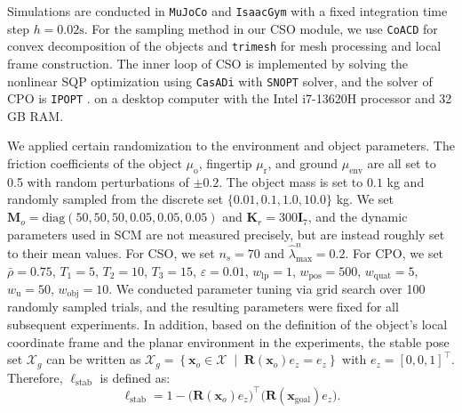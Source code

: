 Simulations are conducted in \texttt{MuJoCo} \cite{todorov2012mujoco} and  \texttt{IsaacGym} \cite{makoviychuk2021isaac} with a fixed integration time step $h=0.02 \text{s}$. For the sampling method in our CSO module, we use \texttt{CoACD} \cite{wei2022approximate} for convex decomposition of the objects and \texttt{trimesh} for mesh processing and local frame construction. The inner loop of CSO is implemented by solving the nonlinear SQP optimization using \texttt{CasADi} \cite{Andersson2019} with \texttt{SNOPT} \cite{gill2005snopt} solver, and the solver of CPO is \texttt{IPOPT} \cite{wachter2006implementation}.  on a desktop computer with the Intel i7-13620H processor and 32 GB RAM.

We applied certain randomization to the environment and object parameters. The friction coefficients of the object $\mu_{\text{o}}$, fingertip $\mu_{\text{r}}$, and ground $\mu_{\text{env}}$ are all set to 0.5 with random perturbations of $\pm 0.2$. The object mass is set to $0.1$ kg and randomly sampled from the discrete set
$\{0.01,0.1,1.0,10.0\}$ kg. We set $\boldsymbol{M}_o=\text{diag}(50,50,50,0.05,0.05,0.05)$ and $\boldsymbol{K}_r=300 \boldsymbol{I}_7$, and the dynamic parameters used in SCM are not measured precisely, but are instead roughly set to their mean values. For CSO, we set $n_s=70$ and $\hat{\lambda}^n_{\text{max}}=0.2$. For CPO, we set $\bar{\rho}=0.75$, $T_1=5$, $T_2=10$, $T_3=15$, $\varepsilon=0.01$, $w_{\text{lp}}=1$, $w_{\text{pos}}=500$, $w_{\text{quat}}=5$, $w_\text{u}=50$, $w_{\text{obj}}=10$. We conducted parameter tuning via grid search over 100 randomly sampled trials, and the resulting parameters were fixed for all subsequent experiments. In addition, based on the definition of the object’s local coordinate frame and the planar environment in the experiments, the stable pose set $\mathcal{X}_g$ can be written as $\mathcal{X}_g=\left\{\boldsymbol{x}_o\in\mathcal{X}\;\middle|\;\boldsymbol{R}\left(\boldsymbol{x}_o\right)e_z=e_z\right\}
$ with $e_z=[0, 0, 1]^\top$. Therefore, $\ell_{\text{stab}}$ is defined as:
\begin{equation}
    \ell_{\text{stab}}=1-\bigl(\boldsymbol{R}(\boldsymbol{x}_o)e_z\bigr)^\top\bigl(\boldsymbol{R}(\boldsymbol{x}_{\text{goal}})e_z\bigr).
\end{equation}

